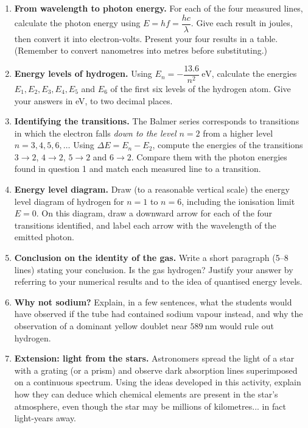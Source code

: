 \documentclass[11pt]{article}
\newcounter{popsec}
\newcounter{popsub}
\newcommand{\courssub}[1]{%
  \stepcounter{popsub}%
  \par\vspace{9pt}\noindent{\popxbold\fontsize{11.5}{13}\selectfont\color{popink}{\color{poporange}\thepopsec.\thepopsub}\hspace{6pt}#1}\par\nopagebreak\vspace{4pt}
}
\begin{document}
\courssub{Tasks}
\begin{exercice}
\begin{enumerate}
\item \textbf{From wavelength to photon energy.} For each of the four measured lines, calculate the photon energy using $E = hf = \dfrac{hc}{\lambda}$. Give each result in joules, then convert it into electron-volts. Present your four results in a table. (Remember to convert nanometres into metres before substituting.)

\item \textbf{Energy levels of hydrogen.} Using $E_n = -\dfrac{13.6}{n^2}\ \mathrm{eV}$, calculate the energies $E_1, E_2, E_3, E_4, E_5$ and $E_6$ of the first six levels of the hydrogen atom. Give your answers in eV, to two decimal places.

\item \textbf{Identifying the transitions.} The Balmer series corresponds to transitions in which the electron falls \emph{down to the level $n = 2$} from a higher level $n = 3, 4, 5, 6, \dots$ Using $\Delta E = E_{n} - E_{2}$, compute the energies of the transitions $3 \rightarrow 2$, $4 \rightarrow 2$, $5 \rightarrow 2$ and $6 \rightarrow 2$. Compare them with the photon energies found in question 1 and match each measured line to a transition.

\item \textbf{Energy level diagram.} Draw (to a reasonable vertical scale) the energy level diagram of hydrogen for $n = 1$ to $n = 6$, including the ionisation limit $E = 0$. On this diagram, draw a downward arrow for each of the four transitions identified, and label each arrow with the wavelength of the emitted photon.

\item \textbf{Conclusion on the identity of the gas.} Write a short paragraph (5--8 lines) stating your conclusion. Is the gas hydrogen? Justify your answer by referring to your numerical results and to the idea of quantised energy levels.

\item \textbf{Why not sodium?} Explain, in a few sentences, what the students would have observed if the tube had contained sodium vapour instead, and why the observation of a dominant yellow doublet near $589\ \mathrm{nm}$ would rule out hydrogen.

\item \textbf{Extension: light from the stars.} Astronomers spread the light of a star with a grating (or a prism) and observe dark absorption lines superimposed on a continuous spectrum. Using the ideas developed in this activity, explain how they can deduce which chemical elements are present in the star's atmosphere, even though the star may be millions of kilometres... in fact light-years away.
\end{enumerate}
\end{exercice}
\end{document}
